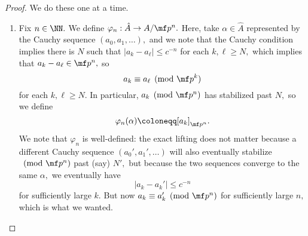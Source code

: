 \documentclass[../notes.tex]{subfiles}
\begin{document}
\begin{proof}
	We do these one at a time.
	\begin{enumerate}[label=(\alph*)]
		\item Fix $n\in\NN.$ We define $\varphi_n:\hat A\to A/\mf p^n.$ Here, take $\alpha\in\hat A$ represented by the Cauchy sequence $(a_0,a_1,\ldots),$ and we note that the Cauchy condition implies there is $N$ such that $|a_k-a_\ell|\le c^{-n}$ for each $k,\ell\ge N,$ which implies that $a_k-a_\ell\in\mf p^n,$ so
		\[a_k\equiv a_\ell\pmod{\mf p^k}\]
		for each $k,\ell\ge N.$ In particular, $a_k\pmod{\mf p^n}$ has stabilized past $N,$ so we define
		\[\varphi_n(\alpha)\coloneqq [a_k]_{\mf p^n}.\]
		We note that $\varphi_n$ is well-defined: the exact lifting does not matter because a different Cauchy sequence $(a_0',a_1',\ldots)$ will also eventually stabilize$\pmod{\mf p^n}$ past (say) $N',$ but because the two sequences converge to the same $\alpha,$ we eventually have
		\[|a_k-a_k'|\le c^{-n}\]
		for sufficiently large $k.$ But now $a_k\equiv a_k'\pmod{\mf p^n}$ for sufficiently large $n,$ which is what we wanted.


\end{enumerate}
\end{proof}
\end{document}
